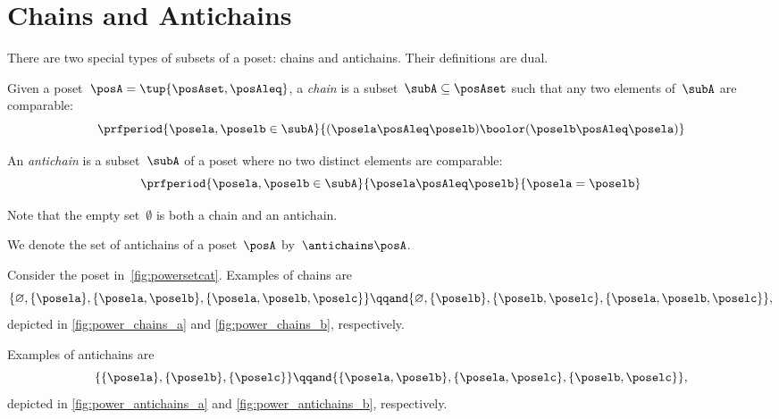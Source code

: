 
\section{Chains and Antichains}
\label{sec:chains-antichains}

There are two special types of subsets of a poset: chains and antichains.
Their definitions are dual.

\begin{definition}
	\label{def:chain}
	Given a poset~$\posA = \tup{\posAset, \posAleq}$, a \emph{chain} is a subset~$\subA \subseteq \posAset$ such that any two elements of~$\subA$ are comparable:
	\begin{equation}
		\prfperiod{
			\posela,\poselb \in \subA
		}{
			(\posela \posAleq  \poselb) \boolor (\poselb \posAleq  \posela)
		}
	\end{equation}
\end{definition}

\begin{definition}
	\label{def:antichain}
	An \emph{antichain} is a subset~$\subA$ of a poset where no two distinct elements are comparable:
	\begin{equation}
		\prfperiod{
			\posela,\poselb \in \subA
		}{
			\posela \posAleq \poselb
		}{
			\posela = \poselb
		}
	\end{equation}
\end{definition}
\begin{remark}
	Note that the empty set~$\emptyset$ is both a chain and an antichain.
\end{remark}

We denote the set of antichains of a poset~$\posA$ by~$\antichains\posA$.


\begin{example}
	Consider the poset in~\cref{fig:powersetcat}.
	Examples of chains are
	\begin{equation}
		\{\varnothing,\{\posela\},\{\posela,\poselb\},\{\posela,\poselb,\poselc\}\}
		\qqand
		\{\varnothing,\{\poselb\},\{\poselb,\poselc\},\{\posela,\poselb,\poselc\}\},
	\end{equation}
	depicted in \cref{fig:power_chains_a} and \cref{fig:power_chains_b}, respectively.
	
	Examples of antichains are
	\begin{equation}
		\{\{\posela\},\{\poselb\},\{\poselc\}\}
		\qqand
		\{ \{\posela,\poselb\},\{\posela,\poselc\}, \{\poselb,\poselc\}\},
	\end{equation}
	depicted in \cref{fig:power_antichains_a} and \cref{fig:power_antichains_b}, respectively.

\end{example}

